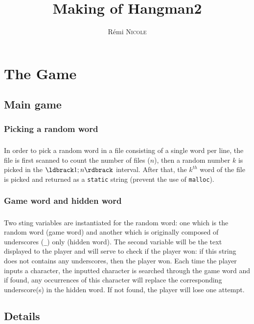 \documentclass{report}
\author{Rémi \textsc{Nicole}}
\title{Making of Hangman2}
\date{}
\begin{document}
\maketitle

\chapter{The Game}

\section{Main game}

\subsection{Picking a random word}

\paragraph{} In order to pick a random word in a file consisting of a single
word per line, the file is first scanned to count the number of files ($n$),
then a random number $k$ is picked in the $\ldbrack1;n\rdbrack$ interval.
After that, the $k^{th}$ word of the file is picked and returned as a
\lstinline[style=prog]|static| string (prevent the use of
\lstinline[style=prog]|malloc|).

\subsection{Game word and hidden word}

\paragraph{} Two sting variables are instantiated for the random word: one
which is the random word (game word) and another which is originally composed
of underscores (\texttt{\_}) only (hidden word). The second variable will be
the text displayed to the player and will serve to check if the player won: if
this string does not contains any underscores, then the player won. Each time
the player inputs a character, the inputted character is searched through the
game word and if found, any occurrences of this character will replace the
corresponding underscore(s) in the hidden word. If not found, the player will
lose one attempt.

\section{Details}
\end{document}
